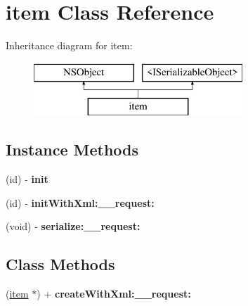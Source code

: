 \hypertarget{interfaceitem}{}\section{item Class Reference}
\label{interfaceitem}
Inheritance diagram for item\+:\begin{figure}[H]
\begin{center}
\leavevmode
\includegraphics[height=2.000000cm]{interfaceitem}
\end{center}
\end{figure}
\subsection*{Instance Methods}
\begin{DoxyCompactItemize}
\item 
\hypertarget{interfaceitem_a358b08481ca799b50038eb0d9d98ff2d}{}(id) -\/ {\bfseries init}\label{interfaceitem_a358b08481ca799b50038eb0d9d98ff2d}

\item 
\hypertarget{interfaceitem_a43ad25da4455e88cb2347244c2f5d160}{}(id) -\/ {\bfseries init\+With\+Xml\+:\+\_\+\+\_\+request\+:}\label{interfaceitem_a43ad25da4455e88cb2347244c2f5d160}

\item 
\hypertarget{interfaceitem_ae7b57697c3aec3fd911410e2307d8250}{}(void) -\/ {\bfseries serialize\+:\+\_\+\+\_\+request\+:}\label{interfaceitem_ae7b57697c3aec3fd911410e2307d8250}

\end{DoxyCompactItemize}
\subsection*{Class Methods}
\begin{DoxyCompactItemize}
\item 
\hypertarget{interfaceitem_a5627a25fccdf6c5b63885e6772db9b9c}{}(\hyperlink{interfaceitem}{item} $\ast$) + {\bfseries create\+With\+Xml\+:\+\_\+\+\_\+request\+:}\label{interfaceitem_a5627a25fccdf6c5b63885e6772db9b9c}

\end{DoxyCompactItemize}
